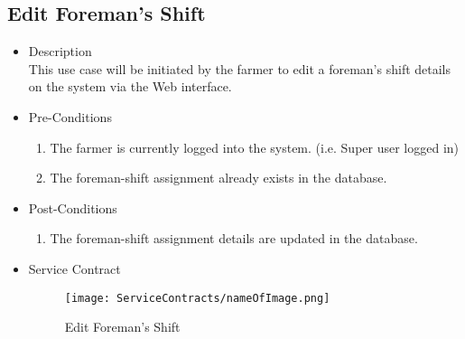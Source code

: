 \documentclass[11pt,fleqn]{book} %
\begin{document}
\subsection{Edit Foreman’s Shift}
\begin{itemize}
	\item Description\\
	This use case will be initiated by the farmer to edit a foreman’s shift details on the system via the Web interface.
	\item Pre-Conditions
	\begin{enumerate}
		\item The farmer is currently logged into the system. (i.e. Super user logged in)
		\item The foreman-shift assignment already exists in the database.	
	\end{enumerate}
	\item Post-Conditions
	\begin{enumerate}
		\item The foreman-shift assignment details are updated in the database.
	\end{enumerate}
	\item Service Contract
	\begin{figure}
		\texttt{[image: ServiceContracts/nameOfImage.png]}
		\caption{Edit Foreman’s Shift}
	\end{figure}
\end{itemize}
\end{document}
